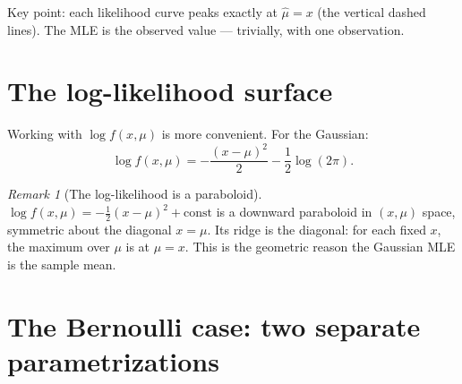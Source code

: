 \documentclass[12pt, a4paper]{article}
\theoremstyle{definition}
\theoremstyle{remark}
\newtheorem*{remark}{Remark}
\begin{document}
Key point: each likelihood curve peaks exactly at
$\hat\mu = x$ (the vertical dashed lines).  The MLE is the
observed value --- trivially, with one observation.

\section{The log-likelihood surface}

Working with $\log f(x,\mu)$ is more convenient.
For the Gaussian:
\[
  \log f(x,\mu)
  = -\frac{(x-\mu)^2}{2} - \frac{1}{2}\log(2\pi).
\]

\begin{center}
\end{center}

\begin{remark}[The log-likelihood is a paraboloid]
$\log f(x,\mu) = -\tfrac{1}{2}(x-\mu)^2 + \mathrm{const}$
is a downward paraboloid in $(x,\mu)$ space, symmetric
about the diagonal $x = \mu$.
Its ridge is the diagonal: for each fixed $x$, the maximum
over $\mu$ is at $\mu = x$.
This is the geometric reason the Gaussian MLE is the sample mean.
\end{remark}

\section{The Bernoulli case: two separate parametrizations}
\end{document}
